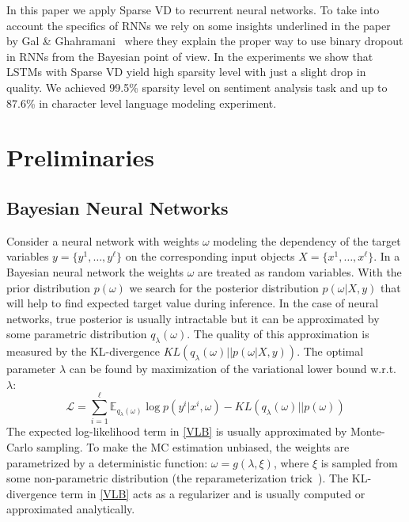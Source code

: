 \documentclass{article}
\begin{document}
In this paper we apply Sparse VD to recurrent neural networks. To take into account the specifics of RNNs we rely on some insights underlined in the paper by Gal \& Ghahramani~ where they explain the proper way to use binary dropout in RNNs from the Bayesian point of view. In the experiments we show that LSTMs with Sparse VD yield high sparsity level with just a slight drop in quality. We achieved 99.5\% sparsity level on sentiment analysis task and up to 87.6\% in character level language modeling experiment.

\section{Preliminaries}
\label{preliminaries}

\subsection{Bayesian Neural Networks}
Consider a neural network with weights $\omega$ modeling the dependency of the target variables $y=\{y^1, \dots, y^\ell\}$ on the corresponding input objects $X = \{x^1, \dots, x^\ell\}$.
In a Bayesian neural network the weights $\omega$ are treated as random variables. With the prior distribution $p(\omega)$ we search for the posterior distribution $p(\omega|X, y)$ that will help to find expected target value during inference.  
In the case of neural networks, true posterior is usually intractable but it can be approximated by some parametric distribution $q_\lambda(\omega)$. 
The quality of this approximation is measured by the KL-divergence $KL(q_\lambda(\omega)||p(\omega|X, y))$.
The optimal parameter $\lambda$ can be found by maximization of the variational lower bound w.r.t. $\lambda$:
\begin{equation}
\label{VLB}
\mathcal{L}=\sum_{i=1}^\ell \mathbb{E}_{q_\lambda(\omega)} \log p(y^i|x^i, \omega) - KL(q_\lambda(\omega)||p(\omega))
\end{equation}
The expected log-likelihood term in \eqref{VLB}
is usually approximated by Monte-Carlo sampling.
To make the MC estimation unbiased, the weights are parametrized by a deterministic function: $\omega = g(\lambda, \xi)$, where $\xi$ is sampled from some non-parametric distribution (the reparameterization trick~\cite{rt}). 
The KL-divergence term in \eqref{VLB}
acts as a regularizer and is usually computed or approximated analytically.
\end{document}
